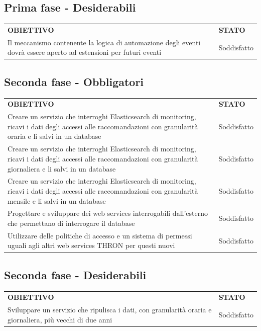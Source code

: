 \documentclass[a4paper, 12pt, twoside, openright]{book}
\begin{document}
\subsection{Prima fase - Desiderabili}
\begin{tabular}{ m{26em} | m{5em} }
	\rowcolor{gray!50}
	\textbf{OBIETTIVO} & \textbf{STATO}\\
	Il meccanismo contenente la logica di automazione degli eventi dovrà essere aperto ad estensioni per futuri eventi & Soddisfatto\\
\end{tabular}

\subsection{Seconda fase - Obbligatori}
\begin{tabular}{ m{26em} | m{5em} }
	\rowcolor{gray!50}
	\textbf{OBIETTIVO} & \textbf{STATO}\\
	Creare un servizio che interroghi Elasticsearch di monitoring, ricavi i dati degli accessi alle raccomandazioni con granularità oraria e li salvi in un database & Soddisfatto\\
	Creare un servizio che interroghi Elasticsearch di monitoring, ricavi i dati degli accessi alle raccomandazioni con granularità giornaliera e li salvi in un database & Soddisfatto\\
	Creare un servizio che interroghi Elasticsearch di monitoring, ricavi i dati degli accessi alle raccomandazioni con granularità mensile e li salvi in un database & Soddisfatto\\
	Progettare e sviluppare dei web services interrogabili dall'esterno che permettano di interrogare il database & Soddisfatto\\
	Utilizzare delle politiche di accesso e un sistema di permessi uguali agli altri web services THRON per questi nuovi & Soddisfatto\\
\end{tabular}

\subsection{Seconda fase - Desiderabili}
\begin{tabular}{ m{26em} | m{5em} }
	\rowcolor{gray!50}
	\textbf{OBIETTIVO} & \textbf{STATO}\\
	Sviluppare un servizio che ripulisca i dati, con granularità oraria e giornaliera, più vecchi di due anni & Soddisfatto\\
\end{tabular}
\end{document}
